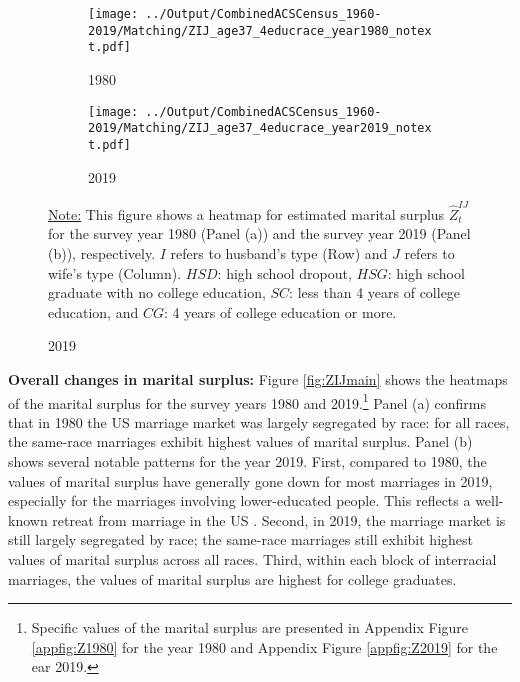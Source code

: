  \begin{figure}[H] \caption{Estimated Marital Surplus Matrix $\hat{\mathbf{Z}}_t$, 1980 vs 2019}      \label{fig:ZIJmain}
  \begin{subfigure}[b]{0.47\textwidth}
           \centering
         \texttt{[image: ../Output/CombinedACSCensus\_1960-2019/Matching/ZIJ\_age37\_4educrace\_year1980\_notext.pdf]}
         \caption{1980} \label{fig:ZIJ1980}
     \end{subfigure}
      \hfill
     \begin{subfigure}[b]{0.47\textwidth}  
          \centering 
        \texttt{[image: ../Output/CombinedACSCensus\_1960-2019/Matching/ZIJ\_age37\_4educrace\_year2019\_notext.pdf]}
         \caption{2019}  \label{fig:ZIJ2019}
        \end{subfigure}
      
        \begin{fignote} 
\underline{Note:} This figure shows a heatmap for estimated marital surplus $\hat{Z}^{IJ}_t$ for the survey year 1980 (Panel (a)) and the survey year 2019 (Panel (b)), respectively. $I$ refers to husband's type (Row) and $J$ refers to wife's type (Column). $HSD$: high school dropout, $HSG$: high school graduate with no college education, $SC$: less than 4 years of college education, and $CG$: 4 years of college education or more.
\end{fignote}
\end{figure}



\noindent \textbf{Overall changes in marital surplus:} Figure \ref{fig:ZIJmain} shows the heatmaps of the marital surplus for the survey years 1980 and 2019.\footnote{Specific values of the marital surplus are presented in Appendix Figure \ref{appfig:Z1980} for the year 1980 and Appendix Figure \ref{appfig:Z2019} for the ear 2019.} Panel (a) confirms that in 1980 the US marriage market was largely segregated by race: for all races, the same-race marriages exhibit highest values of marital surplus. Panel (b) shows several notable patterns for the year 2019. First, compared to 1980, the values of marital surplus have generally gone down for most marriages in 2019, especially for the marriages involving lower-educated people. This reflects a well-known retreat from marriage in the US \citep{LundbergPollakStearns_2016_FamilyInequality}. Second,  in 2019, the marriage market is still largely segregated by race; the same-race marriages still exhibit highest values of marital surplus across all races. Third, within each block of interracial marriages, the values of marital surplus are highest for college graduates. 


